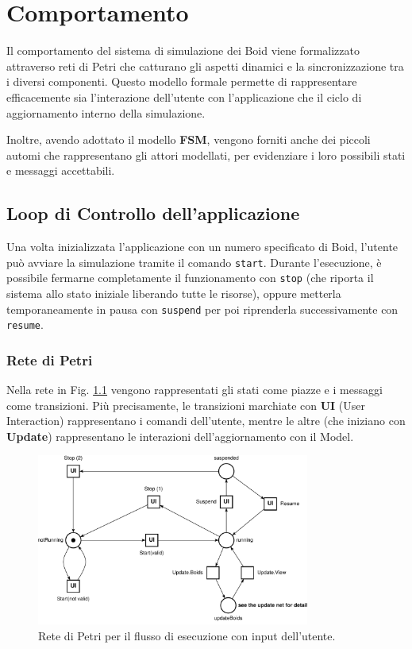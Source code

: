 \documentclass[a4paper,12pt]{report}
\begin{document}
\chapter{Comportamento}
    Il comportamento del sistema di simulazione dei Boid viene formalizzato attraverso reti di Petri che catturano gli aspetti dinamici e la sincronizzazione tra i diversi componenti. Questo modello formale permette di rappresentare efficacemente sia l'interazione dell'utente con l'applicazione che il ciclo di aggiornamento interno della simulazione.

    Inoltre, avendo adottato il modello \textbf{FSM}, vengono forniti anche dei piccoli automi che rappresentano gli attori modellati, per evidenziare i loro possibili stati e messaggi accettabili.
    
    \section{Loop di Controllo dell'applicazione}
        Una volta inizializzata l'applicazione con un numero specificato di Boid, l'utente può avviare la simulazione tramite il comando \texttt{start}. Durante l'esecuzione, è possibile fermarne completamente il funzionamento con \texttt{stop} (che riporta il sistema allo stato iniziale liberando tutte le risorse), oppure metterla temporaneamente in pausa con \texttt{suspend} per poi riprenderla successivamente con \texttt{resume}.

        \subsection*{Rete di Petri}
            Nella rete in Fig. \ref{fig:rete_app_flow} vengono rappresentati gli stati come piazze e i messaggi come transizioni. Più precisamente, le transizioni marchiate con \textbf{UI} (User Interaction) rappresentano i comandi dell'utente, mentre le altre (che iniziano con \textbf{Update}) rappresentano le interazioni dell'aggiornamento con il Model.
            \begin{figure}[ht!]
                \centering
                \includegraphics[width=0.8\textwidth]{petri_nets_pdf/rete_app_flow.pdf}
                \caption{Rete di Petri per il flusso di esecuzione con input dell'utente.}
                \label{fig:rete_app_flow}
            \end{figure}
            
\end{document}
